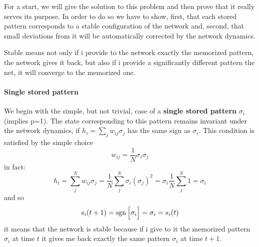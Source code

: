 For a start, we will give the solution to this problem and then prove that it really serves its purpose. In order to do so we have to show, first, that each stored pattern corresponds to a stable configuration of the network and, second, that small deviations from it will be automatically corrected by the network dynamics.
 
 Stable means not only if i provide to the network exactly the memorized pattern, the network gives it back, but also if i provide a significantly different pattern the net, it will converge to the memorized one.
 \paragraph{Single stored pattern}
We begin with the simple, but not trivial, case of a \textbf{single stored pattern} $\sigma_{i}$ (implies p=1). The state corresponding to this pattern remains invariant under the network dynamics, if $h_i =\sum_{j} w_{ij}\sigma_{j}$ has the same sign as $\sigma_{i}$.
This condition is satisfied by the simple choice
\begin{equation}
    w_{ij}=\frac{1}{N}\sigma_{i}\sigma_{j}
    \label{eq:simplelaw}
\end{equation}
in fact:
\begin{equation}
    h_i =\sum_{j}^{N} w_{ij}\sigma_{j}=\frac{1}{N}\sum_{j}^{N} \sigma_{i}(\sigma_{j})^2=\sigma_{i}\frac{1}{N}\sum_{j}^{N}1=\sigma_{i}
    \label{eq:eichi}
\end{equation}
and so 
\begin{equation}
     s_i(t + 1)=\operatorname{sgn}{\Big[\sigma_{i}\Big]}=\sigma_{i}=s_{i}(t)
\end{equation}
it means that the network is stable because if i give to it the memorized pattern $\sigma_{i}$ at time $t$ it gives me back exactly the same pattern $\sigma_{i}$ at time $t+1$.


